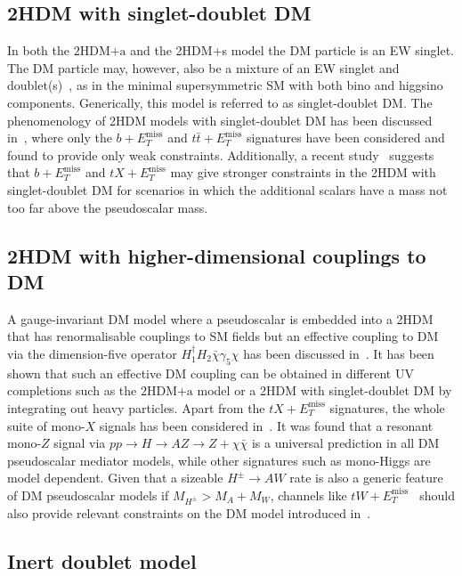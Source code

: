 \documentclass[a4paper, 11pt,notoc]{article}
\newcommand{\MET}{\ensuremath{E_T^\mathrm{miss}}\xspace}
\newcommand{\hdma}{\ensuremath{\textrm{2HDM+a}}\xspace}
\begin{document}
\subsection{2HDM with singlet-doublet DM}

In both the \hdma and the 2HDM+s model the DM particle is  an EW singlet. The DM particle may, however, also be a mixture of an EW singlet and doublet(s)~\cite{Mahbubani:2005pt,Enberg:2007rp,Cohen:2011ec,Cheung:2013dua}, as in the minimal supersymmetric SM with both bino and higgsino components. Generically, this model is referred to as singlet-doublet DM. The phenomenology of 2HDM models with singlet-doublet DM has been discussed in~\cite{Berlin:2015wwa,Arcadi:2018pfo}, where only the $b+\MET$ and $t \bar t+\MET$ signatures have been considered and found to provide only weak constraints. Additionally, a recent study~\cite{Bauer:2017fsw} suggests that $b+\MET$ and $tX+\MET$ may give stronger constraints in the 2HDM with singlet-doublet DM for scenarios in which the additional scalars have a mass not too far above the pseudoscalar mass. 

\subsection{2HDM with  higher-dimensional couplings to DM}

A gauge-invariant DM model where a pseudoscalar is embedded into a 2HDM that has renormalisable couplings to SM fields but an effective coupling to DM via the dimension-five operator $H_1^\dagger H_2 \bar \chi \gamma_5 \chi$ has been  discussed in~\cite{Bauer:2017fsw}. It has been shown that  such an  effective DM coupling can be obtained in different UV completions such as the \hdma model or  a 2HDM with singlet-doublet DM by integrating out heavy particles. Apart from the $t X+\MET$ signatures, the whole suite of mono-$X$ signals has been considered in~\cite{Bauer:2017fsw}. It was found that a resonant mono-$Z$ signal via $pp \to H \to AZ \to  Z + \chi \bar \chi$ is a universal prediction in all DM pseudoscalar mediator models, while other signatures such as mono-Higgs are model dependent. Given that a sizeable $H^\pm \to A W$ rate is also a generic feature of DM pseudoscalar models if $M_{H^\pm} > M_A + M_W$, channels like $tW+\MET$~\cite{Pani:2017qyd} should also  provide relevant constraints on the DM model introduced in~\cite{Bauer:2017fsw}. 

\subsection{Inert doublet model}
\end{document}
